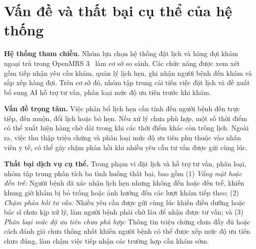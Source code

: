 \section{Vấn đề và thất bại cụ thể của hệ thống}
\noindent \textbf{Hệ thống tham chiếu.} Nhóm lựa chọn hệ thống đặt lịch và hàng đợi khám ngoại trú trong OpenMRS 3~\cite{openmrs_demo} làm cơ sở so sánh. Các chức năng được xem xét gồm tiếp nhận yêu cầu khám, quản lý lịch hẹn, ghi nhận người bệnh đến khám và sắp xếp hàng đợi. Trên cơ sở đó, nhóm tập trung cải tiến việc đặt lịch và đề xuất bổ sung AI hỗ trợ tư vấn, phân loại mức độ ưu tiên trước khi khám.

\noindent \textbf{Vấn đề trọng tâm.} Việc phân bổ lịch hẹn cần tính đến người bệnh đến trực tiếp, đến muộn, đổi lịch hoặc bỏ hẹn. Nếu xử lý chưa phù hợp, một số thời điểm có thể xuất hiện hàng chờ dài trong khi các thời điểm khác còn trống lịch. Ngoài ra, việc thu thập triệu chứng và phân loại mức độ ưu tiên phụ thuộc vào nhân viên y tế, có thể gây chậm phản hồi khi nhiều yêu cầu tư vấn được gửi cùng lúc.

\noindent \textbf{Thất bại dịch vụ cụ thể.} Trong phạm vi đặt lịch và hỗ trợ tư vấn, phân loại, nhóm tập trung phân tích ba tình huống thất bại, bao gồm (1) \textit{Vắng mặt hoặc đến trễ:} Người bệnh đã xác nhận lịch hẹn nhưng không đến hoặc đến trễ, khiến khung giờ khám bị bỏ trống hoặc ảnh hưởng đến các lượt khám tiếp theo; (2) \textit{Chậm phản hồi tư vấn:} Nhiều yêu cầu được gửi cùng lúc khiến điều dưỡng hoặc bác sĩ chưa kịp xử lý, làm người bệnh phải chờ lâu để nhận được tư vấn; và (3) \textit{Phân loại mức độ ưu tiên chưa phù hợp:} Thông tin triệu chứng chưa đầy đủ hoặc cách đánh giá chưa thống nhất khiến người bệnh có thể được xếp mức độ ưu tiên chưa đúng, làm chậm việc tiếp nhận các trường hợp cần khám sớm.
